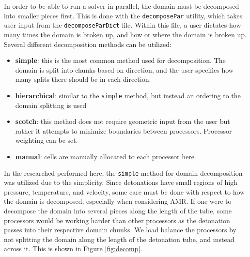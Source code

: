 In order to be able to run a solver in parallel, the domain must be decomposed into smaller pieces first. This is done with the \verb|decomposePar| utility, which takes user input from the \verb|decomposeParDict| file. Within this file, a user dictates how many times the domain is broken up, and how or where the domain is broken up. Several different decomposition methods can be utilized:
\begin{itemize}
\item \textbf{simple}: this is the most common method used for decomposition. The domain is split into chunks based on direction, and the user specifies how many splits there should be in each direction. 
\item \textbf{hierarchical}: similar to the \verb|simple| method, but instead an ordering to the domain splitting is used
\item \textbf{scotch}: this method does not require geometric input from the user but rather it attempts to minimize boundaries between processors. Processor weighting can be set. 
\item \textbf{manual}: cells are manually allocated to each processor here. 
\end{itemize}
In the researched performed here, the \verb|simple| method for domain decomposition was utilized due to the simplicity. Since detonations have small regions of high pressure, temperature, and velocity, some care must be done with respect to how the domain is decomposed, especially when considering AMR. If one were to decompose the domain into several pieces along the length of the tube, some processors would be working harder than other processors as the detonation passes into their respective domain chunks. We load balance the processors by not splitting the domain along the length of the detonation tube, and instead across it. This is shown in Figure \ref{fig:decomp}. 


